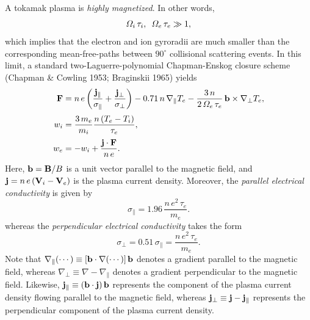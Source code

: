 \documentclass[notitlepage,12pt]{article}
\begin{document}
A tokamak plasma is {\em highly magnetized}. In other words, 
\begin{equation}
{\mit\Omega}_i\,\tau_i, \,\,\,{\mit\Omega}_e\, \tau_e \gg 1,
\end{equation}
 which implies that the electron and ion gyroradii are much  smaller than the
corresponding mean-free-paths between $90^\circ$ collisional scattering events. In this limit, a standard two-Laguerre-polynomial
Chapman-Enskog closure scheme (Chapman \& Cowling 1953; Braginskii 1965) yields
\begin{align}\label{e3.91a}
{\bf F}&= n\,e\left(\frac{{\bf j}_\parallel}{\sigma_\parallel}
+\frac{{\bf j}_\perp}{\sigma_\perp}\right) -0.71\,n\,\nabla_\parallel T_e
-\frac{3\,n}{2\,{\mit\Omega}_e\,\tau_e}\,{\bf b}\times\nabla_\perp T_e,
\\[0.5ex]
w_i &= \frac{3\,m_e}{m_i} \frac{n\,(T_e-T_i)}{\tau_e},\\[0.5ex]
w_e &= -w_i + \frac{ {\bf j}\cdot {\bf F} }{n \,e}.
\end{align}
Here, ${\bf b}={\bf B}/B$ is a unit vector parallel to the magnetic field, and ${\bf j}= n\,e\,({\bf V}_i-{\bf V}_e)$ is the plasma current density. 
Moreover, the {\em parallel electrical conductivity}\/ is given by
\begin{equation}\label{e3.83}
\sigma_\parallel = 1.96\,\frac{n \,e^2\,\tau_e}{m_e}.
\end{equation} 
whereas the {\em perpendicular electrical conductivity}\/ takes the form
\begin{equation}\label{e3.92}
\sigma_\perp = 0.51\,\sigma_\parallel = \frac{n\,e^2\,\tau_e}{m_e}.
\end{equation}
Note that $\nabla_\parallel(\cdots) \equiv [{\bf b}\cdot\nabla
(\cdots)]\,{\bf b}$ denotes a
gradient parallel to the magnetic field, whereas $\nabla_\perp \equiv
 \nabla-\nabla_\parallel$ denotes a gradient perpendicular to the magnetic
field. Likewise, ${\bf j}_\parallel \equiv ({\bf b}\cdot{\bf j})\,{\bf b}$
represents the component of the plasma current density  flowing parallel to the
magnetic field, whereas ${\bf j}_\perp \equiv {\bf j} - {\bf j}_\parallel$
represents the perpendicular component of the plasma current density.
\end{document}

